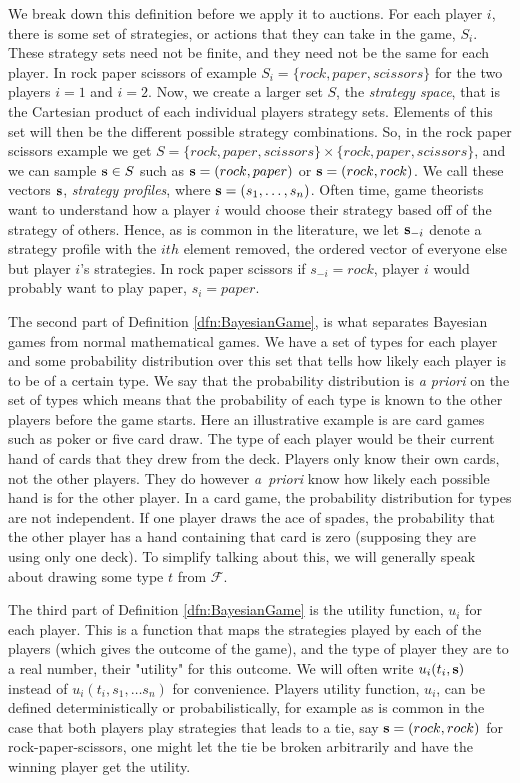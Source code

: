 \documentclass[12pt,twoside]{reedthesis}
\begin{document}
We break down this definition before we apply it to auctions. For each player $i$, there is some set of strategies, or actions that they can take in the game, $S_i$. These strategy sets need not be finite, and they need not be the same for each player. In rock paper scissors of example $S_i = \{rock, paper, scissors\}$ for the two players $i =1$ and $i = 2$. Now, we create a larger set $S$, the {\em strategy space}, that is the Cartesian product of each individual players strategy sets. Elements of this set will then be the different possible strategy combinations. So, in the rock paper scissors example we get $S = \{rock, paper, scissors\} \times \{rock, paper, scissors\}$, and we can sample $\textbf{s} \in S$ such as $\textbf{s} = (rock, paper)$ or $\textbf{s} = (rock, rock)$. We call these vectors $\textbf{s}$, {\em strategy profiles}, where $\textbf{s} = (s_1, \ldots, s_n)$. Often time, game theorists want to understand how a player $i$ would choose their strategy based off of the strategy of others. Hence, as is common in the literature, we let $\textbf{s}_{-i}$ denote a strategy profile with the $ith$ element removed, the ordered vector of everyone else but player $i$'s strategies. In rock paper scissors if $s_{-i} = {rock}$, player $i$ would probably want to play paper, $s_i = paper$. 

The second part of Definition \ref{dfn:BayesianGame}, is what separates Bayesian games from normal mathematical games. We have a set of types for each player and some probability distribution over this set that tells how likely each player is to be of a certain type. We say that the probability distribution is {\em a priori} on the set of types which means that the probability of each type is known to the other players before the game starts. Here an illustrative example is are card games such as poker or five card draw. The type of each player would be their current hand of cards that they drew from the deck. Players only know their own cards, not the other players. They do however {\em a~priori} know how likely each possible hand is for the other player. In a card game, the probability distribution for types are not independent. If one player draws the ace of spades, the probability that the other player has a hand containing that card is zero (supposing they are using only one deck). To simplify talking about this, we will generally speak about drawing some type $t$ from $\mathcal{F}$.

The third part of Definition \ref{dfn:BayesianGame} is the utility function, $u_i$ for each player. This is a function that maps the strategies played by each of the players (which gives the outcome of the game), and the type of player they are to a real number, their "utility" for this outcome. We will often write $u_i(t_i, \textbf{s})$ instead of $u_i(t_i, s_1, \ldots s_n)$ for convenience. Players utility function, $u_i$, can be defined deterministically or probabilistically, for example as is common in the case that both players play strategies that leads to a tie, say $\textbf{s} = (rock, rock)$ for rock-paper-scissors, one might let the tie be broken arbitrarily and have the winning player get the utility.
\end{document}
